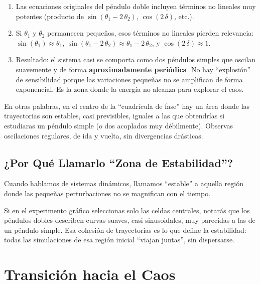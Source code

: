 \documentclass[
  10pt,
  a4paper,
  DIV=11,
  numbers=noendperiod,
  open=any]{scrreprt}
\providecommand{\tightlist}{%
  \setlength{\itemsep}{0pt}\setlength{\parskip}{0pt}}
\numberwithin{equation}{chapter}
\numberwithin{equation}{section}
\renewcommand{\[}{\begin{equation}}
\renewcommand{\]}{\end{equation}}
\begin{document}
\begin{enumerate}
\def\labelenumi{\arabic{enumi}.}
\tightlist
\item
  Las ecuaciones originales del péndulo doble incluyen términos no
  lineales muy potentes (producto de \(\sin(\theta_1 - 2\,\theta_2)\),
  \(\cos(2\,\delta)\), etc.).\\
\item
  Si \(\theta_1\) y \(\theta_2\) permanecen pequeños, esos términos no
  lineales pierden relevancia: \(\sin(\theta_1)\approx \theta_1\),
  \(\sin(\theta_1 - 2\,\theta_2)\approx \theta_1 - 2\,\theta_2\), y
  \(\cos(2\,\delta)\approx 1\).\\
\item
  Resultado: el sistema casi se comporta como dos péndulos simples que
  oscilan suavemente y de forma \textbf{aproximadamente periódica}. No
  hay ``explosión'' de sensibilidad porque las variaciones pequeñas no
  se amplifican de forma exponencial. Es la zona donde la energía no
  alcanza para explorar el caos.
\end{enumerate}

En otras palabras, en el centro de la ``cuadrícula de fase'' hay un área
donde las trayectorias son estables, casi previsibles, iguales a las que
obtendrías si estudiaras un péndulo simple (o dos acoplados muy
débilmente). Observas oscilaciones regulares, de ida y vuelta, sin
divergencias drásticas.

\subsection{¿Por Qué Llamarlo ``Zona de
Estabilidad''?}\label{por-quuxe9-llamarlo-zona-de-estabilidad}

Cuando hablamos de sistemas dinámicos, llamamos ``estable'' a aquella
región donde las pequeñas perturbaciones no se magnifican con el tiempo.

Si en el experimento gráfico seleccionas solo las celdas centrales,
notarás que los péndulos dobles describen curvas suaves, casi
sinusoidales, muy parecidas a las de un péndulo simple. Esa cohesión de
trayectorias es lo que define la estabilidad: todas las simulaciones de
esa región inicial ``viajan juntas'', sin dispersarse.

\section{Transición hacia el Caos}\label{transiciuxf3n-hacia-el-caos}
\end{document}
